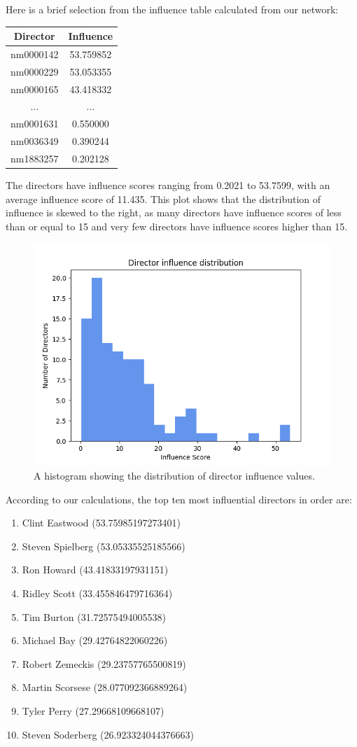 \documentclass[12pt]{article}
\begin{document}
Here is a brief selection from the influence table calculated from our network:
\begin{table}[h!]
\centering
\begin{tabular}{|c|c|}
\hline
\textbf{Director} & \textbf{Influence} \\ \hline
nm0000142& 53.759852\\ \hline
nm0000229& 53.053355\\ \hline
nm0000165& 43.418332\\ \hline
...               & ...                \\ \hline
nm0001631& 0.550000\\ \hline
nm0036349& 0.390244\\ \hline
nm1883257& 0.202128\\ \hline
\end{tabular}
\end{table}

The directors have influence scores ranging from 0.2021 to 53.7599, with an average influence score of 11.435. This plot shows that the distribution of influence is skewed to the right, as many directors have influence scores of less than or equal to 15 and very few directors have influence scores higher than 15. 

\begin{figure}[ht]
    \centering
    \includegraphics[width=0.33\linewidth]{1_influence_hist.png}
    \caption{A histogram showing the distribution of director influence values.}
    \label{fig:influence_hist}
\end{figure}

According to our calculations, the top ten most influential directors in order are:
\begin{enumerate}[itemsep=-6pt]
    \item Clint Eastwood (53.75985197273401)
    \item Steven Spielberg (53.05335525185566)
    \item Ron Howard (43.41833197931151)
    \item Ridley Scott (33.455846479716364)
    \item Tim Burton (31.72575494005538)
    \item Michael Bay (29.42764822060226)
    \item Robert Zemeckis (29.23757765500819)
    \item Martin Scorsese (28.077092366889264)
    \item Tyler Perry (27.29668109668107)
    \item Steven Soderberg (26.923324044376663)
\end{enumerate}
\end{document}
